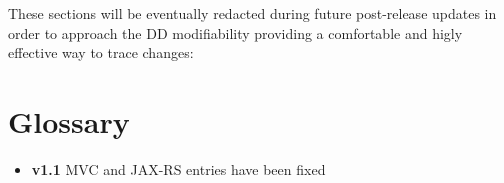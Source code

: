 These sections will be eventually redacted during future post-release updates in order to approach the DD modifiability providing a comfortable and higly effective way to trace changes:
\section{Glossary}
	\begin{itemize}
		\item \textbf{v1.1} MVC and JAX-RS entries have been fixed
	\end{itemize}